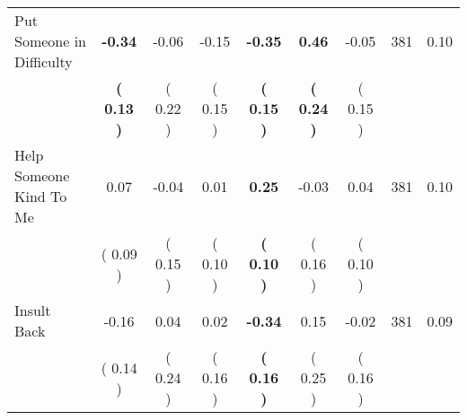 \begin{tabular}{lcccccccc}
Put Someone in Difficulty & \textbf{    -0.34} &     -0.06 &     -0.15 & \textbf{    -0.35} & \textbf{     0.46} &     -0.05 & 381 &       0.10 \\ 
 & \textbf{(     0.13 )} & (     0.22 ) & (     0.15 ) & \textbf{(     0.15 )} & \textbf{(     0.24 )} & (     0.15 ) & \\
Help Someone Kind To Me &      0.07 &     -0.04 &      0.01 & \textbf{     0.25} &     -0.03 &      0.04 & 381 &       0.10 \\ 
 & (     0.09 ) & (     0.15 ) & (     0.10 ) & \textbf{(     0.10 )} & (     0.16 ) & (     0.10 ) & \\
Insult Back &     -0.16 &      0.04 &      0.02 & \textbf{    -0.34} &      0.15 &     -0.02 & 381 &       0.09 \\ 
 & (     0.14 ) & (     0.24 ) & (     0.16 ) & \textbf{(     0.16 )} & (     0.25 ) & (     0.16 ) & \\
\bottomrule
\end{tabular}
